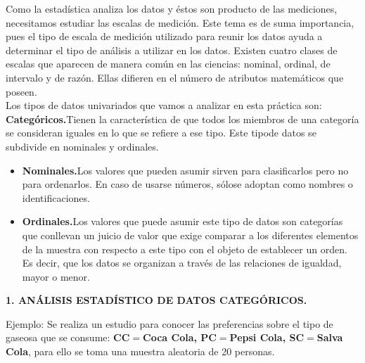 \documentclass[12pt,letterpaper]{article}\usepackage[]{graphicx}\usepackage[]{color}
\begin{document}
Como la estad\'istica analiza los datos y \'estos son producto de las mediciones, necesitamos estudiar las escalas de medici\'on. Este tema es de suma importancia, pues el tipo de escala de medici\'on utilizado para reunir los datos ayuda a determinar el tipo de an\'alisis a utilizar en los datos. Existen cuatro clases de escalas que aparecen de manera com\'un en las ciencias: nominal, ordinal, de intervalo y de raz\'on. Ellas difieren en el n\'umero de atributos matem\'aticos que poseen.\\


Los tipos de datos univariados que vamos a analizar en esta pr\'actica son:\\

\textbf{Categ\'oricos.}Tienen la caracter\'istica de que todos los miembros de una categor\'ia se consideran iguales en lo que se refiere a ese tipo. Este tipode datos se subdivide en nominales y ordinales.

\begin{itemize}
  \item \textbf{Nominales.}Los valores que pueden asumir sirven para clasificarlos pero no para ordenarlos. En caso de usarse n\'umeros, s\'olose adoptan como nombres o identificaciones.
  \item \textbf{Ordinales.}Los valores que puede asumir este tipo de datos son categor\'ias que conllevan un juicio de valor que exige comparar a los diferentes elementos de la muestra con respecto a este tipo con el objeto de establecer un orden. Es decir, que los datos se organizan a trav\'es de las relaciones de igualdad, mayor o menor. 
\end{itemize}
\begin{center}
  \textbf{1. AN\'ALISIS ESTAD\'ISTICO DE DATOS CATEG\'ORICOS.}
\end{center}

Ejemplo: Se realiza un estudio para conocer las preferencias sobre el tipo de gaseosa que se consume: \textbf{CC$=$Coca Cola, PC$=$Pepsi Cola, SC$=$Salva Cola}, para ello se toma una muestra aleatoria de 20 personas.\\
\end{document}
